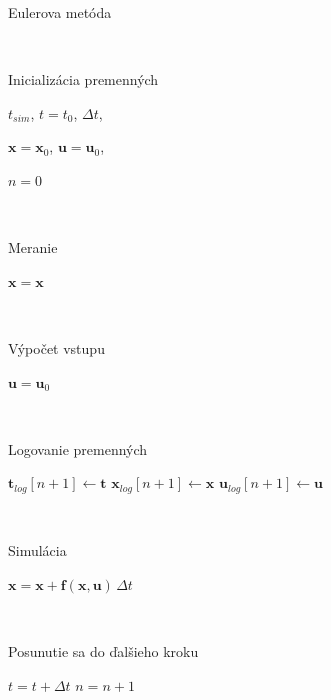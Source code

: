 \documentclass[a4paper, 10pt, ]{article}
\begin{document}
\begin{algorithm}[H]
    \caption{Eulerova metóda}
    \label{Algorithm:Euler}
    \begin{algorithmic}[1]
        \Statex \

        \noindent Inicializácia premenných
        
        \State $t_{sim}$, \quad
        $t = t_0$, \quad
        $\Delta t$, \quad

        \State $\bm{x} = \bm{x}_0$, \quad
        $\bm{u} = \bm{u}_0$, \quad
        
        \State $n = 0$

        \item[]

            \Statex \
            
            \noindent Meranie

            \State $\bm{x} = \bm{x}$
            
            \Statex \
            
            \noindent Výpočet vstupu
            
            \State $\bm{u} = \bm{u}_0$
            
            \Statex \
            
            \noindent Logovanie premenných

            \State $\bm{t}_{log}[n + 1] \leftarrow \bm{t}$
            \State $\bm{x}_{log}[n + 1] \leftarrow \bm{x}$
            \State $\bm{u}_{log}[n + 1] \leftarrow \bm{u}$
            
            \Statex \
            
            \noindent Simulácia
            
            \State $\bm{x} = \bm{x} + \bm{f}(\bm{x}, \bm{u}) \, \Delta t$
            
            \Statex \
            
            \noindent Posunutie sa do ďalšieho kroku

            \State $t = t + \Delta t$
            \State $n = n + 1$
        \EndWhile


    \end{algorithmic}
\end{algorithm}
\end{document}
